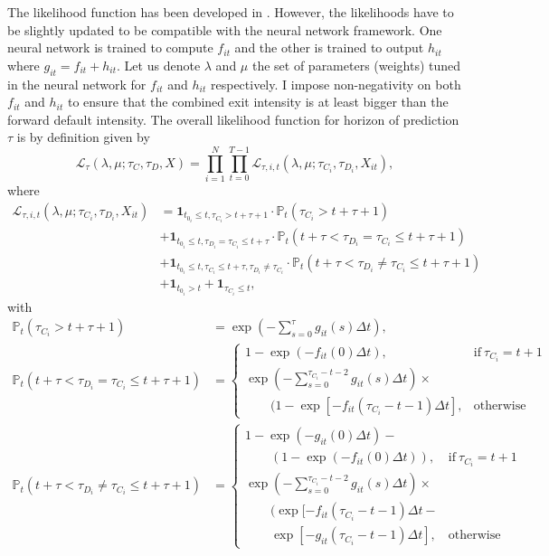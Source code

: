 The likelihood function has been developed in \citet{Duan2012}. However, the likelihoods have to be slightly updated to be compatible with the neural network framework. One neural network is trained to compute $f_{it}$ and the other is trained to output $h_{it}$ where $g_{it} = f_{it} + h_{it}$.  Let us denote $\lambda$ and $\mu$ the set of parameters (weights) tuned in the neural network for $f_{it}$ and $h_{it}$ respectively. I impose non-negativity on both $f_{it}$ and $h_{it}$ to ensure that the combined exit intensity is at least bigger than the forward default intensity. The overall likelihood function for horizon of prediction $\tau$ is by definition given by 
\begin{equation} \label{biglik}
\mathcal{L}_\tau(\lambda,\mu; \tau_C,\tau_D, X) = \prod_{i=1}^N \prod_{t=0}^{T-1} \mathcal{L}_{\tau,i,t}(\lambda,\mu; \tau_{C_i},\tau_{D_i}, X_{it}),
\end{equation}
where
\begin{align}
    \mathcal{L}_{\tau,i,t}(\lambda,\mu; \tau_{C_i},\tau_{D_i}, X_{it}) &= \textbf{1}_{t_{0_i} \leq t, \tau_{C_i} > t+\tau+1} \cdot \mathbb{P}_t(\tau_{C_i} > t + \tau + 1) \\ \nonumber
    &+ \textbf{1}_{t_{0_i} \leq t, \tau_{D_i}=\tau_{C_i} \leq t+\tau} \cdot \mathbb{P}_t(t+\tau < \tau_{D_i} = \tau_{C_i} \leq t + \tau + 1) \\ \nonumber
    &+ \textbf{1}_{t_{0_i} \leq t, \tau_{C_i} \leq t+\tau, \tau_{D_i} \neq \tau_{C_i}} \cdot \mathbb{P}_t(t+\tau < \tau_{D_i} \neq \tau_{C_i} \leq t+\tau + 1) \\ \nonumber
    &+ \textbf{1}_{t_{0_i}>t} + \textbf{1}_{\tau_{C_i} \leq t},
\end{align}
with
\begin{align}
    \mathbb{P}_t(\tau_{C_i} > t + \tau + 1) &= \exp(-\sum_{s=0}^{\tau}g_{it}(s)\Delta t), \\
    \mathbb{P}_t(t+\tau < \tau_{D_i} = \tau_{C_i} \leq t + \tau + 1) &=    
    \begin{cases}
      1-\exp(-f_{it}(0)\Delta t), & \text{if}\ \tau_{C_i} = t+1 \\
      \exp(-\sum\limits_{s=0}^{\tau_{C_i}-t-2}g_{it}(s)\Delta t) \times \\
          \qquad (1-\exp[-f_{it}(\tau_{C_i}-t-1)\Delta t], & \text{otherwise}
    \end{cases} \\
    \mathbb{P}_t(t+\tau < \tau_{D_i} \neq \tau_{C_i} \leq t+\tau + 1)&=
    \begin{cases}
      1-\exp(-g_{it}(0)\Delta t)- \\ 
      \qquad ( 1-\exp(-f_{it}(0)\Delta t)), & \text{if}\ \tau_{C_i} = t+1 \\
      \exp(-\sum\limits_{s=0}^{\tau_{C_i}-t-2}g_{it}(s)\Delta t) \times \\
          \qquad (\exp[-f_{it}(\tau_{C_i}-t-1)\Delta t -  \\ 
          \qquad \exp[-g_{it}(\tau_{C_i}-t-1)\Delta t], & \text{otherwise}
    \end{cases}
\end{align}

